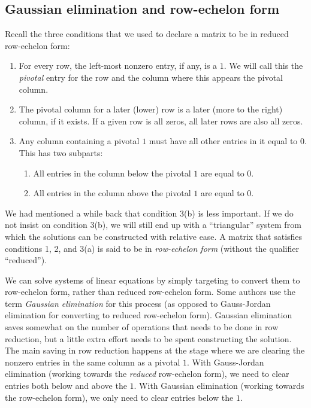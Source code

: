 \documentclass[10pt]{amsart}
\begin{document}
\subsection{Gaussian elimination and row-echelon form}

Recall the three conditions that we used to declare a matrix to be in
reduced row-echelon form:

\begin{enumerate}
\item For every row, the left-most nonzero entry, if any, is a $1$. We
  will call this the {\em pivotal} entry for the row and the column
  where this appears the pivotal column.
\item The pivotal column for a later (lower) row is a later (more to
  the right) column, if it exists. If a given row is all zeros, all
  later rows are also all zeros.
\item Any column containing a pivotal $1$ must have all other entries
  in it equal to $0$. This has two subparts:

  \begin{enumerate}
  \item All entries in the column below the pivotal $1$ are equal to $0$.
  \item All entries in the column above the pivotal $1$ are equal to $0$.
  \end{enumerate}
\end{enumerate}

We had mentioned a while back that condition 3(b) is less
important. If we do not insist on condition 3(b), we will still end up
with a ``triangular'' system from which the solutions can be
constructed with relative ease. A matrix that satisfies conditions 1,
2, and 3(a) is said to be in {\em row-echelon form} (without the
qualifier ``reduced'').

We can solve systems of linear equations by simply targeting to
convert them to row-echelon form, rather than reduced row-echelon
form. Some authors use the term {\em Gaussian elimination} for this
process (as opposed to Gauss-Jordan elimination for converting to
reduced row-echelon form). Gaussian elimination saves somewhat on the
number of operations that needs to be done in row reduction, but a
little extra effort needs to be spent constructing the solution. The
main saving in row reduction happens at the stage where we are
clearing the nonzero entries in the same column as a pivotal $1$. With
Gauss-Jordan elimination (working towards the {\em reduced}
row-echelon form), we need to clear entries both below and above the
$1$. With Gaussian elimination (working towards the row-echelon form),
we only need to clear entries below the $1$.
\end{document}
